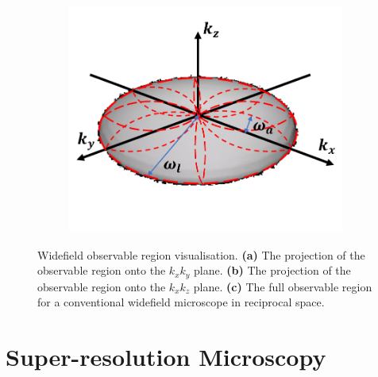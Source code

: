 \begin{figure}[h]
\begin{subfigure}[t]{0.27\textwidth}
		\includegraphics[width=\linewidth]{images/3D_SIM_OTF_no_angle_axis.png}
		\caption{}
		\label{fig:WF_OTF}
	\end{subfigure}
	\caption[Widefield observable region visualisation]{Widefield observable 
		region visualisation. \textbf{(a)} The projection of the observable 
		region onto the $k_{x}k_{y}$ plane. \textbf{(b)} The projection of 
		the observable region onto the $k_{x}k_{z}$ plane. \textbf{(c)} The 
		full observable region for a conventional widefield microscope in 
		reciprocal space.}
	\label{fig:widefield_OTF_visualisation}
\end{figure}

\section{Super-resolution Microscopy}
\label{sec:super_res}


